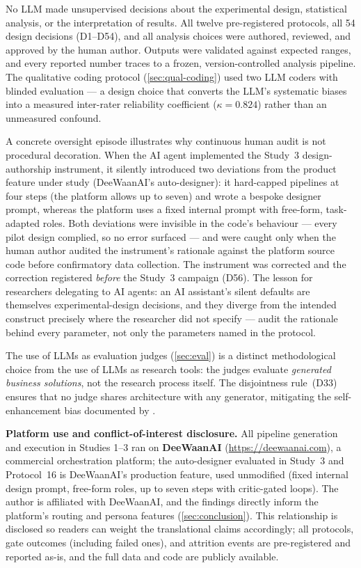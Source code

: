 \documentclass[12pt,a4paper]{article}
\begin{document}
No LLM made unsupervised decisions about the experimental design, statistical
analysis, or the interpretation of results. All twelve pre-registered protocols,
all 54 design decisions (D1--D54), and all analysis choices were authored,
reviewed, and approved by the human author. Outputs were
validated against expected ranges, and every reported number traces to a frozen,
version-controlled analysis pipeline. The qualitative coding protocol
(\cref{sec:qual-coding}) used two LLM coders with blinded evaluation --- a
design choice that converts the LLM's systematic biases into a measured
inter-rater reliability coefficient ($\kappa = 0.824$) rather than an unmeasured
confound.

A concrete oversight episode illustrates why continuous human audit is not
procedural decoration. When the AI agent implemented the Study~3
design-authorship instrument, it silently introduced two deviations from the
product feature under study (DeeWaanAI's auto-designer): it hard-capped
pipelines at four steps (the platform allows up to seven) and wrote a bespoke
designer prompt, whereas the platform uses a fixed internal prompt with
free-form, task-adapted roles. Both deviations were invisible in the code's
behaviour --- every pilot design complied, so no error surfaced --- and were
caught only when the human author audited the instrument's rationale against
the platform source code before confirmatory data collection. The instrument
was corrected and the correction registered \emph{before} the Study~3
campaign (D56). The lesson for researchers delegating to AI agents: an AI
assistant's silent defaults are themselves experimental-design decisions, and
they diverge from the intended construct precisely where the researcher did
not specify --- audit the rationale behind every parameter, not only the
parameters named in the protocol.

The use of LLMs as evaluation judges (\cref{sec:eval}) is a distinct
methodological choice from the use of LLMs as research tools: the judges
evaluate \emph{generated business solutions}, not the research process itself.
The disjointness rule~(D33) ensures that no judge shares architecture with any
generator, mitigating the self-enhancement bias documented by
\citet{ZhengEtAl2023}.

\textbf{Platform use and conflict-of-interest disclosure.} All pipeline
generation and execution in Studies 1--3 ran on \textbf{DeeWaanAI}
(\url{https://deewaanai.com}), a commercial orchestration platform; the
auto-designer evaluated in Study~3 and Protocol~16 is DeeWaanAI's production
feature, used unmodified (fixed internal design prompt, free-form roles,
up to seven steps with critic-gated loops). The author is affiliated with
DeeWaanAI, and the findings directly inform the platform's routing and
persona features (\cref{sec:conclusion}). This relationship is disclosed so
readers can weight the translational claims accordingly; all protocols,
gate outcomes (including failed ones), and attrition events are
pre-registered and reported as-is, and the full data and code are publicly
available.
\end{document}
